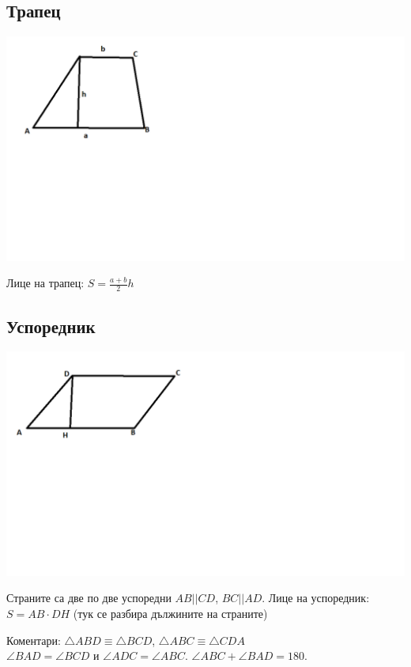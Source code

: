 \documentclass{article}
\begin{document}
\vspace{-6cm}

\subsection{Трапец}

	
\includegraphics{Trapezoid}
\vspace{-8cm}

Лице на трапец: $S = \frac{a+b}{2}h$

\subsection{Успоредник}


\includegraphics{Parallelogram}
\vspace{-6cm}

Страните са две по две успоредни $AB || CD$, $BC||AD $. 
Лице на успоредник: $S = AB \cdot DH$ (тук се разбира дължините на страните)

Коментари: $\triangle ABD \equiv \triangle  BCD $, 
 $\triangle ABC \equiv \triangle CDA $ \\
 $\angle BAD = \angle BCD $ и $ \angle ADC = \angle ABC $. $\angle ABC + \angle BAD = 180$.
\end{document}
